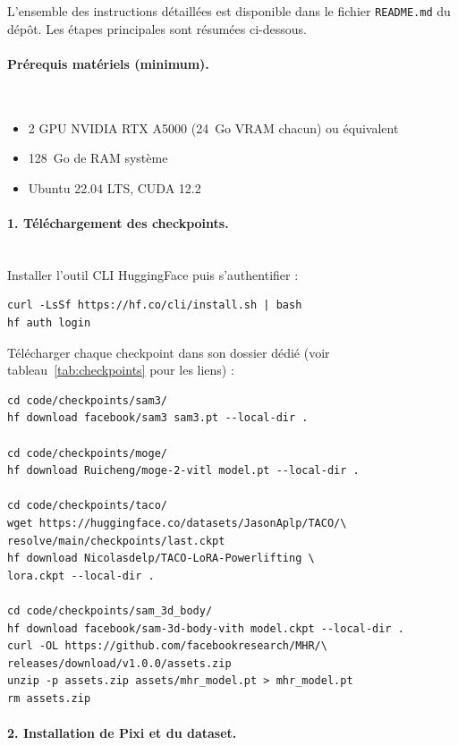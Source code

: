 L'ensemble des instructions détaillées est disponible dans le fichier \texttt{README.md} du dépôt. Les étapes principales sont résumées ci-dessous.

\paragraph{Prérequis matériels (minimum).}~\\
\begin{itemize}
  \item 2 GPU NVIDIA RTX A5000 (24~Go VRAM chacun) ou équivalent
  \item 128~Go de RAM système
  \item Ubuntu 22.04 LTS, CUDA 12.2
\end{itemize}

\paragraph{1. Téléchargement des checkpoints.}~\\

Installer l'outil CLI HuggingFace puis s'authentifier :

\begin{lstlisting}[style=bash]
curl -LsSf https://hf.co/cli/install.sh | bash
hf auth login
\end{lstlisting}

Télécharger chaque checkpoint dans son dossier dédié
(voir tableau~\ref{tab:checkpoints} pour les liens) :

\begin{lstlisting}[style=bash]
cd code/checkpoints/sam3/
hf download facebook/sam3 sam3.pt --local-dir .

cd code/checkpoints/moge/
hf download Ruicheng/moge-2-vitl model.pt --local-dir .

cd code/checkpoints/taco/
wget https://huggingface.co/datasets/JasonAplp/TACO/\
resolve/main/checkpoints/last.ckpt
hf download Nicolasdelp/TACO-LoRA-Powerlifting \
lora.ckpt --local-dir .

cd code/checkpoints/sam_3d_body/
hf download facebook/sam-3d-body-vith model.ckpt --local-dir .
curl -OL https://github.com/facebookresearch/MHR/\
releases/download/v1.0.0/assets.zip
unzip -p assets.zip assets/mhr_model.pt > mhr_model.pt
rm assets.zip
\end{lstlisting}

\paragraph{2. Installation de Pixi et du dataset.}~\\

